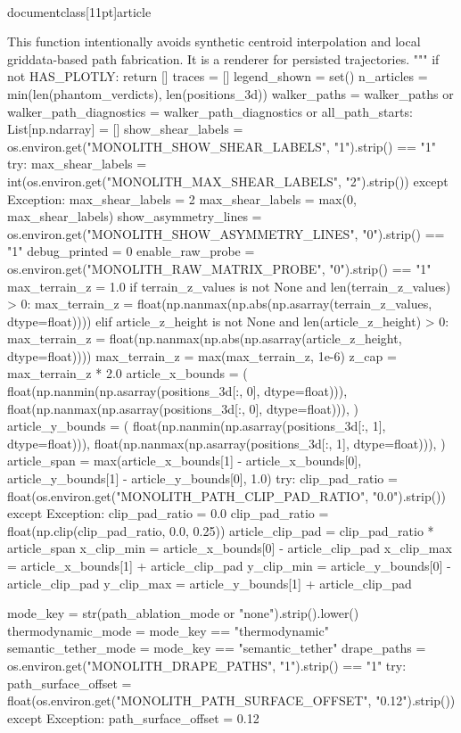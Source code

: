 \\documentclass[11pt]{article}
\begin{document}
\begin{CodeBlock}
{{    This function intentionally avoids synthetic centroid interpolation and local
    griddata-based path fabrication. It is a renderer for persisted trajectories.
    """
    if not HAS_PLOTLY: return []
    traces = []
    legend_shown = set()
    n_articles = min(len(phantom_verdicts), len(positions_3d))
    walker_paths = walker_paths or {}
    walker_path_diagnostics = walker_path_diagnostics or {}
    all_path_starts: List[np.ndarray] = []
    show_shear_labels = os.environ.get("MONOLITH_SHOW_SHEAR_LABELS", "1").strip() == "1"
    try:
        max_shear_labels = int(os.environ.get("MONOLITH_MAX_SHEAR_LABELS", "2").strip())
    except Exception:
        max_shear_labels = 2
    max_shear_labels = max(0, max_shear_labels)
    show_asymmetry_lines = os.environ.get("MONOLITH_SHOW_ASYMMETRY_LINES", "0").strip() == "1"
    debug_printed = 0
    enable_raw_probe = os.environ.get("MONOLITH_RAW_MATRIX_PROBE", "0").strip() == "1"
    max_terrain_z = 1.0
    if terrain_z_values is not None and len(terrain_z_values) > 0:
        max_terrain_z = float(np.nanmax(np.abs(np.asarray(terrain_z_values, dtype=float))))
    elif article_z_height is not None and len(article_z_height) > 0:
        max_terrain_z = float(np.nanmax(np.abs(np.asarray(article_z_height, dtype=float))))
    max_terrain_z = max(max_terrain_z, 1e-6)
    z_cap = max_terrain_z * 2.0
    article_x_bounds = (
        float(np.nanmin(np.asarray(positions_3d[:, 0], dtype=float))),
        float(np.nanmax(np.asarray(positions_3d[:, 0], dtype=float))),
    )
    article_y_bounds = (
        float(np.nanmin(np.asarray(positions_3d[:, 1], dtype=float))),
        float(np.nanmax(np.asarray(positions_3d[:, 1], dtype=float))),
    )
    article_span = max(article_x_bounds[1] - article_x_bounds[0], article_y_bounds[1] - article_y_bounds[0], 1.0)
    try:
        clip_pad_ratio = float(os.environ.get("MONOLITH_PATH_CLIP_PAD_RATIO", "0.0").strip())
    except Exception:
        clip_pad_ratio = 0.0
    clip_pad_ratio = float(np.clip(clip_pad_ratio, 0.0, 0.25))
    article_clip_pad = clip_pad_ratio * article_span
    x_clip_min = article_x_bounds[0] - article_clip_pad
    x_clip_max = article_x_bounds[1] + article_clip_pad
    y_clip_min = article_y_bounds[0] - article_clip_pad
    y_clip_max = article_y_bounds[1] + article_clip_pad

    mode_key = str(path_ablation_mode or "none").strip().lower()
    thermodynamic_mode = mode_key == "thermodynamic"
    semantic_tether_mode = mode_key == "semantic_tether"
    drape_paths = os.environ.get("MONOLITH_DRAPE_PATHS", "1").strip() == "1"
    try:
        path_surface_offset = float(os.environ.get("MONOLITH_PATH_SURFACE_OFFSET", "0.12").strip())
    except Exception:
        path_surface_offset = 0.12

}}
\end{CodeBlock}
\end{document}
